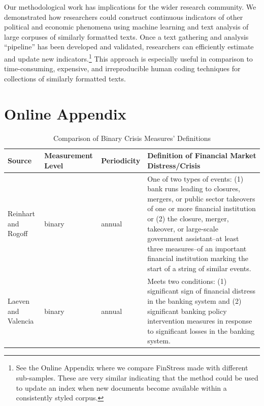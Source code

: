 \documentclass[]{article}
\begin{document}
Our methodological work has implications for the wider research community. We demonstrated how researchers could construct continuous indicators of other political and economic phenomena using machine learning and text analysis of large corpuses of similarly formatted texts. Once a text gathering and analysis ``pipeline'' \citep{Leek2015} has been developed and validated, researchers can efficiently estimate and update new indicators.\footnote{See the Online Appendix where we compare FinStress made with different sub-samples. These are very similar indicating that the method could be used to update an index when new documents become available within a consistently styled corpus.} This approach is especially useful in comparison to time-consuming, expensive, and irreproducible human coding techniques for collections of similarly formatted texts.




\pagebreak
\renewcommand{\thepage}{A-\arabic{page}}\setcounter{page}{1}
\renewcommand{\thesection}{Appendix \arabic{section}}\setcounter{section}{0}
\renewcommand{\thetable}{A-\arabic{table}}\setcounter{table}{0}
\renewcommand{\thefigure}{A-\arabic{figure}}\setcounter{figure}{0}
\clearpage

\section*{Online Appendix}

\begin{table}[H]
    \caption{Comparison of Binary Crisis Measures' Definitions}
    \label{comp_table}
    \begin{center}
        \begin{tabular}{m{3cm} | m{2cm} m{2cm} m{7cm}}
            Source & Measurement Level & Periodicity &  Definition of Financial Market Distress/Crisis \\
            \hline\hline
                Reinhart and Rogoff \citeyearpar[11]{Reinhart2009,ReinhartRog2010} & binary & annual & One of two types of events: (1) bank runs leading to closures, mergers, or public sector takeovers of one or more financial institution or (2) the closure, merger, takeover, or large-scale government assistant--at least three measures--of an important financial institution marking the start of a string of similar events.  \\[1cm]
                Laeven and Valencia \citeyearpar[228]{laeven2013} & binary & annual & Meets two conditions: (1) significant sign of financial distress in the banking system and (2) significant banking policy intervention measures in response to significant losses in the banking system.  \\[1cm]
            \hline
        \end{tabular}
    \end{center}
\end{table}
\end{document}
